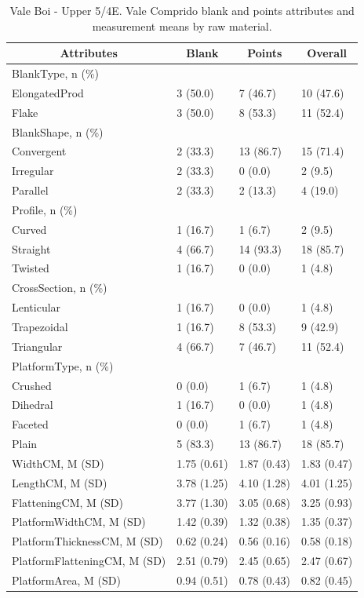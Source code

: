 \documentclass[12pt,twoside]{reedthesis}
\begin{document}
\begin{table}[!h]

\caption{\label{tab:VCvb}Vale Boi - Upper 5/4E. Vale Comprido blank and points attributes and measurement means by raw material.}
\centering
\fontsize{9}{11}\selectfont
\begin{tabular}[t]{llll}
\toprule
\multicolumn{1}{c}{\textbf{Attributes}} & \multicolumn{1}{c}{\textbf{Blank}} & \multicolumn{1}{c}{\textbf{Points}} & \multicolumn{1}{c}{\textbf{Overall}}\\
\midrule
BlankType, n (\%) &  &  & \\
ElongatedProd & 3 (50.0) & 7 (46.7) & 10 (47.6)\\
Flake & 3 (50.0) & 8 (53.3) & 11 (52.4)\\
BlankShape, n (\%) &  &  & \\
Convergent & 2 (33.3) & 13 (86.7) & 15 (71.4)\\
\addlinespace
Irregular & 2 (33.3) & 0 (0.0) & 2 (9.5)\\
Parallel & 2 (33.3) & 2 (13.3) & 4 (19.0)\\
Profile, n (\%) &  &  & \\
Curved & 1 (16.7) & 1 (6.7) & 2 (9.5)\\
Straight & 4 (66.7) & 14 (93.3) & 18 (85.7)\\
\addlinespace
Twisted & 1 (16.7) & 0 (0.0) & 1 (4.8)\\
CrossSection, n (\%) &  &  & \\
Lenticular & 1 (16.7) & 0 (0.0) & 1 (4.8)\\
Trapezoidal & 1 (16.7) & 8 (53.3) & 9 (42.9)\\
Triangular & 4 (66.7) & 7 (46.7) & 11 (52.4)\\
\addlinespace
PlatformType, n (\%) &  &  & \\
Crushed & 0 (0.0) & 1 (6.7) & 1 (4.8)\\
Dihedral & 1 (16.7) & 0 (0.0) & 1 (4.8)\\
Faceted & 0 (0.0) & 1 (6.7) & 1 (4.8)\\
Plain & 5 (83.3) & 13 (86.7) & 18 (85.7)\\
\addlinespace
WidthCM, M (SD) & 1.75 (0.61) & 1.87 (0.43) & 1.83 (0.47)\\
LengthCM, M (SD) & 3.78 (1.25) & 4.10 (1.28) & 4.01 (1.25)\\
FlatteningCM, M (SD) & 3.77 (1.30) & 3.05 (0.68) & 3.25 (0.93)\\
PlatformWidthCM, M (SD) & 1.42 (0.39) & 1.32 (0.38) & 1.35 (0.37)\\
PlatformThicknessCM, M (SD) & 0.62 (0.24) & 0.56 (0.16) & 0.58 (0.18)\\
\addlinespace
PlatformFlatteningCM, M (SD) & 2.51 (0.79) & 2.45 (0.65) & 2.47 (0.67)\\
PlatformArea, M (SD) & 0.94 (0.51) & 0.78 (0.43) & 0.82 (0.45)\\
\bottomrule
\end{tabular}
\end{table}
\end{document}
